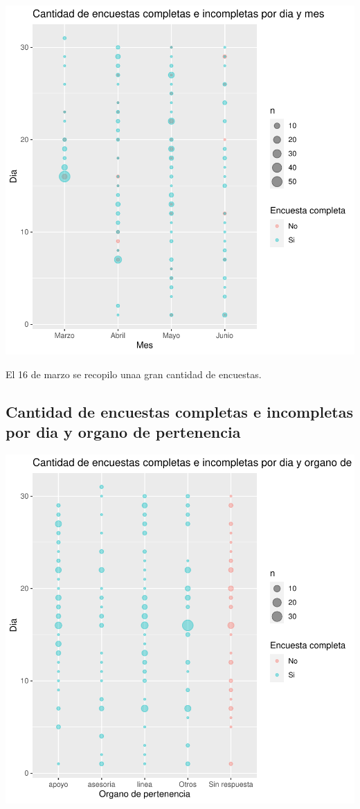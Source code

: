 \documentclass{article}
\begin{document}
\includegraphics{seguimientov3-077}

El 16 de marzo se recopilo unaa gran cantidad de encuestas.

\subsection{Cantidad de encuestas completas e incompletas por dia y organo de pertenencia}

\includegraphics{seguimientov3-078}
\end{document}

